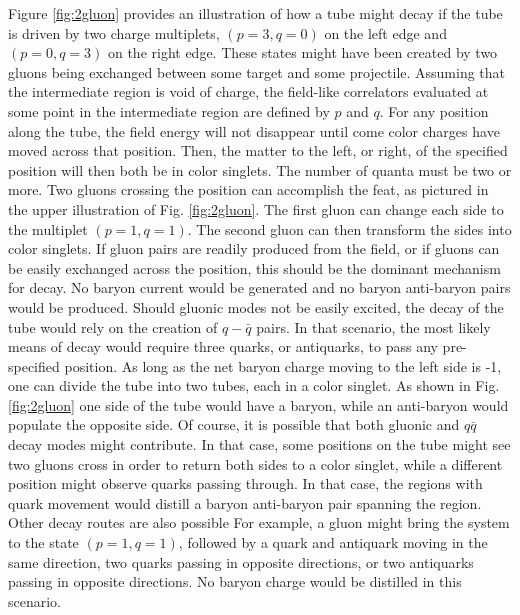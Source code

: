\documentclass[aps, prc, 12pt, nofootinbib, showpacs, superscriptaddress, tightenlines, groupedaddress]{revtex4-2}
\begin{document}
Figure \ref{fig:2gluon} provides an illustration of how a tube might decay if the tube is driven by two charge multiplets, $(p=3,q=0)$ on the left edge and $(p=0,q=3)$ on the right edge.  These states might have been created by two gluons being exchanged between some target and some projectile. Assuming that the intermediate region is void of charge, the field-like correlators evaluated at some point in the intermediate region are defined by $p$ and $q$. For any position along the tube, the field energy will not disappear until come color charges have moved across that position. Then, the matter to the left, or right, of the specified position will then both be in color singlets. The number of quanta must be two or more. Two gluons crossing the position can accomplish the feat, as pictured in the upper illustration of Fig. \ref{fig:2gluon}. The first gluon can change each side to the multiplet $(p=1,q=1)$. The second gluon can then transform the sides into color singlets. If gluon pairs are readily produced from the field, or if gluons can be easily exchanged across the position, this should be the dominant mechanism for decay. No baryon current would be generated and no baryon anti-baryon pairs would be produced. Should gluonic modes not be easily excited, the decay of the tube would rely on the creation of $q-\bar{q}$ pairs. In that scenario, the most likely means of decay would require three quarks, or antiquarks, to pass any pre-specified position. As long as the net baryon charge moving to the left side is -1, one can divide the tube into two tubes, each in a color singlet. As shown in Fig. \ref{fig:2gluon} one side of the tube would have a baryon, while an anti-baryon would populate the opposite side. Of course, it is possible that both gluonic and $q\bar{q}$ decay modes might contribute. In that case, some positions on the tube might see two gluons cross in order to return both sides to a color singlet, while a different position might observe quarks passing through. In that case, the regions with quark movement would distill a baryon anti-baryon pair spanning the region. Other decay routes are also possible For example, a gluon might bring the system to the state $(p=1,q=1)$, followed by a quark and antiquark moving in the same direction, two quarks passing in opposite directions, or two antiquarks passing in opposite directions. No baryon charge would be distilled in this scenario.
\end{document}
